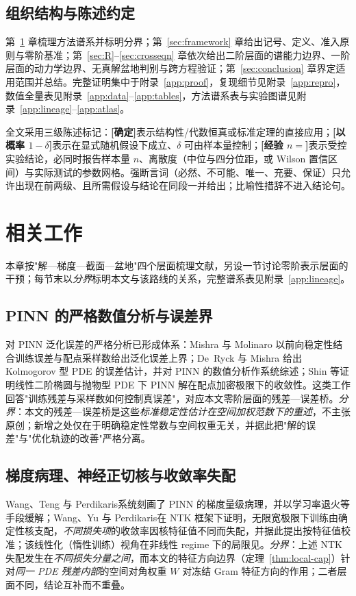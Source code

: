 \documentclass[fontset=windows,11pt]{ctexart}
\newcommand{\W}{W}
\numberwithin{equation}{section}
\begin{document}
\subsection{组织结构与陈述约定}\label{sec:convention}
第~\ref{sec:related} 章梳理方法谱系并标明分界；第~\ref{sec:framework} 章给出记号、定义、准入原则与零阶基准；第~\ref{sec:R}--\ref{sec:crosseqn} 章依次给出二阶层面的谱能力边界、一阶层面的动力学边界、无真解盆地判别与跨方程验证；第~\ref{sec:conclusion} 章界定适用范围并总结。完整证明集中于附录~\ref{app:proof}，复现细节见附录~\ref{app:repro}，数值全量表见附录~\ref{app:data}--\ref{app:tables}，方法谱系表与实验图谱见附录~\ref{app:lineage}--\ref{app:atlas}。

全文采用三级陈述标记：\textbf{[确定]}表示结构性/代数恒真或标准定理的直接应用；\textbf{[以概率 $1-\delta$]}表示在显式随机假设下成立、$\delta$ 可由样本量控制；\textbf{[经验 $n=$]}表示受控实验结论，必同时报告样本量 $n$、离散度（中位与四分位距，或 Wilson 置信区间）与实际测试的参数网格。强断言词（必然、不可能、唯一、充要、保证）只允许出现在前两级、且所需假设与结论在同段一并给出；比喻性措辞不进入结论句。

\FloatBarrier

\section{相关工作}\label{sec:related}
本章按"解—梯度—截面—盆地"四个层面梳理文献，另设一节讨论零阶表示层面的干预；每节末以\emph{分界}标明本文与该路线的关系，完整谱系表见附录~\ref{app:lineage}。

\subsection{PINN 的严格数值分析与误差界}\label{sec:rel-error}
对 PINN 泛化误差的严格分析已形成体系：Mishra 与 Molinaro\cite{MishraMolinaro2020} 以前向稳定性结合训练误差与配点采样数给出泛化误差上界；De~Ryck 与 Mishra 给出 Kolmogorov 型 PDE 的误差估计，并对 PINN 的数值分析作系统综述\cite{DeRyckMishra2022,DeRyckMishra2024}；Shin 等证明线性二阶椭圆与抛物型 PDE 下 PINN 解在配点加密极限下的收敛性\cite{Shin2020}。这类工作回答"训练残差与采样数如何控制真误差"，对应本文零阶层面的残差—误差桥。\emph{分界}：本文的残差—误差桥是这些\emph{标准稳定性估计在空间加权范数下的重述}，不主张原创；新增之处仅在于明确稳定性常数与空间权重无关，并据此把"解的误差"与"优化轨迹的改善"严格分离。

\subsection{梯度病理、神经正切核与收敛率失配}\label{sec:rel-ntk}
Wang、Teng 与 Perdikaris\cite{WangTeng2020}系统刻画了 PINN 的梯度量级病理，并以学习率退火等手段缓解；Wang、Yu 与 Perdikaris\cite{Wang2020NTK}在 NTK 框架下证明，无限宽极限下训练由确定性核支配，\emph{不同损失项}的收敛率因核特征值不同而失配，并据此提出按特征值校准；该线性化（惰性训练）视角在非线性 regime 下的局限见\cite{Bonfanti2024}。\emph{分界}：上述 NTK 失配发生在\emph{不同损失分量之间}，而本文的特征方向边界（定理~\ref{thm:local-cap}）针对\emph{同一 PDE 残差内部}的空间对角权重 $\W$ 对冻结 Gram 特征方向的作用；二者层面不同，结论互补而不重叠。
\end{document}

